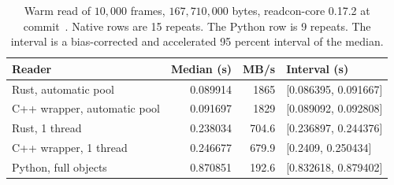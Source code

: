 \begin{table}[ht]
\centering
\small
\caption{Warm read of \(10{,}000\) frames, \(167{,}710{,}000\) bytes, readcon-core 0.17.2 at commit~\readconcommitshort{}. Native rows are 15 repeats. The Python row is 9 repeats. The interval is a bias-corrected and accelerated 95 percent interval of the median.}
\label{tab:perf}
\begin{tabular}{lrrl}
\toprule
Reader & Median (s) & MB/s & Interval (s) \\
\midrule
Rust, automatic pool & 0.089914 & 1865 & [0.086395, 0.091667] \\
C++ wrapper, automatic pool & 0.091697 & 1829 & [0.089092, 0.092808] \\
Rust, 1 thread & 0.238034 & 704.6 & [0.236897, 0.244376] \\
C++ wrapper, 1 thread & 0.246677 & 679.9 & [0.2409, 0.250434] \\
Python, full objects & 0.870851 & 192.6 & [0.832618, 0.879402] \\
\bottomrule
\end{tabular}
\end{table}

